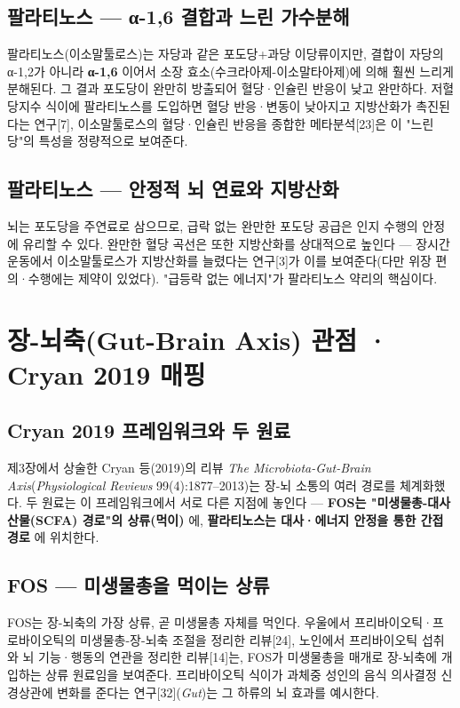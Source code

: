 \documentclass[11pt,oneside]{book}
\begin{document}
\subsection{팔라티노스 — α-1,6 결합과 느린 가수분해}
팔라티노스(이소말툴로스)는 자당과 같은 포도당+과당 이당류이지만, 결합이 자당의 α-1,2가 아니라 \textbf{α-1,6} 이어서 소장 효소(수크라아제-이소말타아제)에 의해 훨씬 느리게 분해된다. 그 결과 포도당이 완만히 방출되어 혈당·인슐린 반응이 낮고 완만하다. 저혈당지수 식이에 팔라티노스를 도입하면 혈당 반응·변동이 낮아지고 지방산화가 촉진된다는 연구[7], 이소말툴로스의 혈당·인슐린 반응을 종합한 메타분석[23]은 이 "느린 당"의 특성을 정량적으로 보여준다.

\subsection{팔라티노스 — 안정적 뇌 연료와 지방산화}
뇌는 포도당을 주연료로 삼으므로, 급락 없는 완만한 포도당 공급은 인지 수행의 안정에 유리할 수 있다. 완만한 혈당 곡선은 또한 지방산화를 상대적으로 높인다 — 장시간 운동에서 이소말툴로스가 지방산화를 늘렸다는 연구[3]가 이를 보여준다(다만 위장 편의·수행에는 제약이 있었다). "급등락 없는 에너지"가 팔라티노스 약리의 핵심이다.

\section{장-뇌축(Gut-Brain Axis) 관점 · Cryan 2019 매핑}
\subsection{Cryan 2019 프레임워크와 두 원료}
제3장에서 상술한 Cryan 등(2019)의 리뷰 \textit{The Microbiota-Gut-Brain Axis}(\textit{Physiological Reviews} 99(4):1877–2013)는 장-뇌 소통의 여러 경로를 체계화했다. 두 원료는 이 프레임워크에서 서로 다른 지점에 놓인다 — \textbf{FOS는 "미생물총-대사산물(SCFA) 경로"의 상류(먹이)} 에, \textbf{팔라티노스는 대사·에너지 안정을 통한 간접 경로} 에 위치한다.

\subsection{FOS — 미생물총을 먹이는 상류}
FOS는 장-뇌축의 가장 상류, 곧 미생물총 자체를 먹인다. 우울에서 프리바이오틱·프로바이오틱의 미생물총-장-뇌축 조절을 정리한 리뷰[24], 노인에서 프리바이오틱 섭취와 뇌 기능·행동의 연관을 정리한 리뷰[14]는, FOS가 미생물총을 매개로 장-뇌축에 개입하는 상류 원료임을 보여준다. 프리바이오틱 식이가 과체중 성인의 음식 의사결정 신경상관에 변화를 준다는 연구[32](\textit{Gut})는 그 하류의 뇌 효과를 예시한다.
\end{document}
